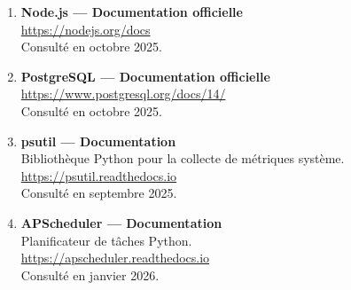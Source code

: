 \begin{enumerate}
\item \textbf{Node.js — Documentation officielle} \\
\url{https://nodejs.org/docs} \\
Consulté en octobre 2025.

\item \textbf{PostgreSQL — Documentation officielle} \\
\url{https://www.postgresql.org/docs/14/} \\
Consulté en octobre 2025.

\item \textbf{psutil — Documentation} \\
Bibliothèque Python pour la collecte de métriques système. \\
\url{https://psutil.readthedocs.io} \\
Consulté en septembre 2025.

\item \textbf{APScheduler — Documentation} \\
Planificateur de tâches Python. \\
\url{https://apscheduler.readthedocs.io} \\
Consulté en janvier 2026.

\end{enumerate}
